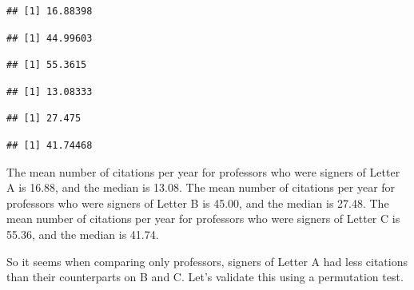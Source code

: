 \documentclass[]{article}
\begin{document}
\begin{verbatim}
## [1] 16.88398
\end{verbatim}

\begin{verbatim}
## [1] 44.99603
\end{verbatim}

\begin{verbatim}
## [1] 55.3615
\end{verbatim}

\begin{verbatim}
## [1] 13.08333
\end{verbatim}

\begin{verbatim}
## [1] 27.475
\end{verbatim}

\begin{verbatim}
## [1] 41.74468
\end{verbatim}

The mean number of citations per year for professors who were signers of
Letter A is 16.88, and the median is 13.08. The mean number of citations
per year for professors who were signers of Letter B is 45.00, and the
median is 27.48. The mean number of citations per year for professors
who were signers of Letter C is 55.36, and the median is 41.74.

So it seems when comparing only professors, signers of Letter A had less
citations than their counterparts on B and C. Let's validate this using
a permutation test.
\end{document}
